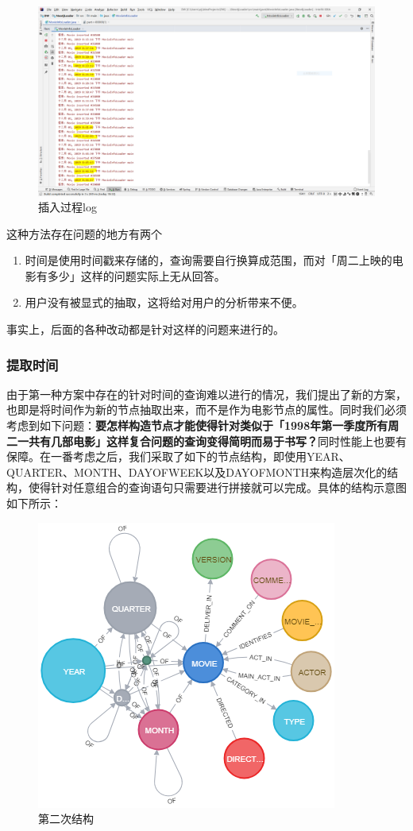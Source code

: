 \documentclass{ctexrep}
\begin{document}
	\begin{figure}[H]
		\centering
		\includegraphics[width=0.7\linewidth]{img/indexInInsersion}
		\caption{插入过程log}
		\label{fig:index}
	\end{figure}
	这种方法存在问题的地方有两个\begin{enumerate}
		\item 时间是使用时间戳来存储的，查询需要自行换算成范围，而对「周二上映的电影有多少」这样的问题实际上无从回答。
		\item 用户没有被显式的抽取，这将给对用户的分析带来不便。
	\end{enumerate}
事实上，后面的各种改动都是针对这样的问题来进行的。
	
	\subsubsection{提取时间} \label{neo:2}
	由于第一种方案中存在的针对时间的查询难以进行的情况，我们提出了新的方案，也即是将时间作为新的节点抽取出来，而不是作为电影节点的属性。同时我们必须考虑到如下问题：\textbf{要怎样构造节点才能使得针对类似于「1998年第一季度所有周二一共有几部电影」这样复合问题的查询变得简明而易于书写？}同时性能上也要有保障。在一番考虑之后，我们采取了如下的节点结构，即使用YEAR、QUARTER、MONTH、DAYOFWEEK以及DAYOFMONTH来构造层次化的结构，使得针对任意组合的查询语句只需要进行拼接就可以完成。具体的结构示意图如下所示：
	\begin{figure}[H]
		\centering
		\includegraphics[width=0.7\linewidth]{img/graph2}
		\caption{第二次结构}
		\label{fig:graph2}
	\end{figure}
	
\end{document}
